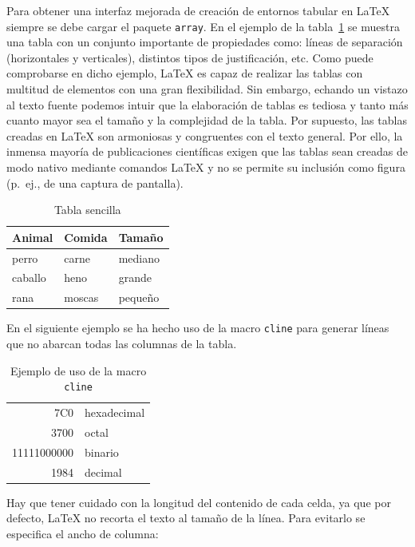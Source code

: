 \documentclass[ 		%
	11pt,				%
	a4paper,			%
	twoside,			%
	openright,			%
	final       		%
]{book}
\begin{document}
Para obtener una interfaz mejorada de creación de entornos tabular en \LaTeX{} siempre se debe cargar el paquete \texttt{array}. En el ejemplo de la tabla~\ref{tab:simple} se muestra una tabla con un conjunto importante de propiedades como: líneas de separación (horizontales y verticales), distintos tipos de justificación, etc. Como puede comprobarse en dicho ejemplo, \LaTeX{} es capaz de realizar las tablas con multitud de elementos con una gran flexibilidad. Sin embargo, echando un vistazo al texto fuente podemos intuir que la elaboración de tablas es tediosa y tanto más cuanto mayor sea el tamaño y la complejidad de la tabla. Por supuesto, las tablas creadas en \LaTeX{} son armoniosas y congruentes con el texto general. Por ello, la inmensa mayoría de publicaciones científicas exigen que las tablas sean creadas de modo nativo mediante comandos \LaTeX{} y no se permite su inclusión como figura (p.~ej., de una captura de pantalla).

\begin{table}[H]%
	\centering
	\caption[Ejemplo de entorno \texttt{table}]{Tabla sencilla}		  \label{tab:simple}
    \begin{tabular}{l|l|l}
      \textbf{Animal}  & \textbf{Comida} & \textbf{Tamaño} \\
      \hline
      perro   & carne  & mediano \\
      caballo & heno   & grande  \\
      rana    & moscas & pequeño \\
    \end{tabular}
\end{table}

En el siguiente ejemplo se ha hecho uso de la macro \texttt{cline} para generar líneas que no abarcan todas las columnas de la tabla.

\begin{table}[H]%
	\centering
	\caption{Ejemplo de uso de la macro \texttt{cline}}
	\label{tab:cline}
	\begin{tabular}[t]{|r|l|}
	\hline
	7C0 & hexadecimal \\[1cm] %
	3700 & octal \\ \cline{2-2}
	11111000000 & binario \\
	\hline \hline
	1984 & decimal \\
	\hline
	\end{tabular}
\end{table}

Hay que tener cuidado con la longitud del contenido de cada celda, ya que por defecto, \LaTeX{} no recorta el texto al tamaño de la línea. Para evitarlo se especifica el ancho de columna:
\end{document}
